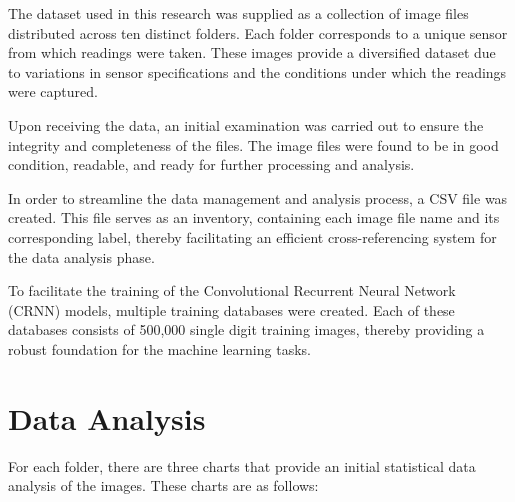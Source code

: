 The dataset used in this research was supplied as a collection of image files distributed across ten distinct folders. Each folder corresponds to a unique sensor from which readings were taken. These images provide a diversified dataset due to variations in sensor specifications and the conditions under which the readings were captured.

Upon receiving the data, an initial examination was carried out to ensure the integrity and completeness of the files. The image files were found to be in good condition, readable, and ready for further processing and analysis.

In order to streamline the data management and analysis process, a CSV file was created. This file serves as an inventory, containing each image file name and its corresponding label, thereby facilitating an efficient cross-referencing system for the data analysis phase.

To facilitate the training of the Convolutional Recurrent Neural Network (CRNN) models, multiple training databases were created. Each of these databases consists of 500,000 single digit training images, thereby providing a robust foundation for the machine learning tasks.

\newpage
\section{Data Analysis}

For each folder, there are three charts that provide an initial statistical data analysis of the images. These charts are as follows:


